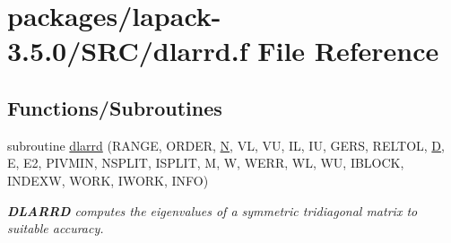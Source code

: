 \hypertarget{dlarrd_8f}{}\section{packages/lapack-\/3.5.0/\+S\+R\+C/dlarrd.f File Reference}
\label{dlarrd_8f}
\subsection*{Functions/\+Subroutines}
\begin{DoxyCompactItemize}
\item 
subroutine \hyperlink{group__auxOTHERauxiliary_gaa9fa3671522ed0e21695769fd85982c7}{dlarrd} (R\+A\+N\+G\+E, O\+R\+D\+E\+R, \hyperlink{polmisc_8c_a0240ac851181b84ac374872dc5434ee4}{N}, V\+L, V\+U, I\+L, I\+U, G\+E\+R\+S, R\+E\+L\+T\+O\+L, \hyperlink{odrpack_8h_a7dae6ea403d00f3687f24a874e67d139}{D}, E, E2, P\+I\+V\+M\+I\+N, N\+S\+P\+L\+I\+T, I\+S\+P\+L\+I\+T, M, W, W\+E\+R\+R, W\+L, W\+U, I\+B\+L\+O\+C\+K, I\+N\+D\+E\+X\+W, W\+O\+R\+K, I\+W\+O\+R\+K, I\+N\+F\+O)
\begin{DoxyCompactList}\small\item\em {\bfseries D\+L\+A\+R\+R\+D} computes the eigenvalues of a symmetric tridiagonal matrix to suitable accuracy. \end{DoxyCompactList}\end{DoxyCompactItemize}
